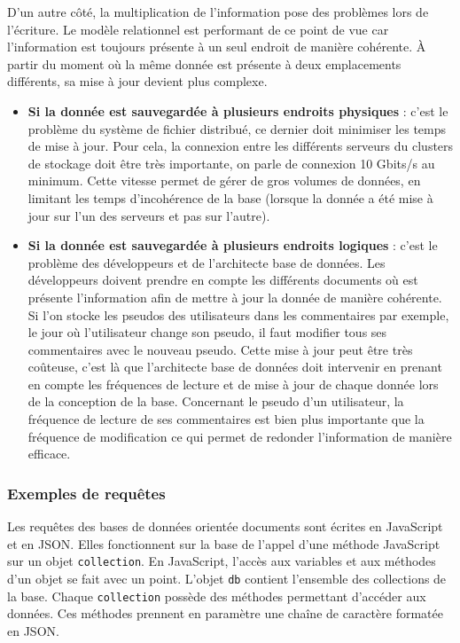   D'un autre côté, la multiplication de l'information pose des problèmes lors de l'écriture. Le modèle relationnel est performant de ce point de vue car l'information est toujours présente à un seul endroit de manière cohérente. À partir du moment où la même donnée est présente à deux emplacements différents, sa mise à jour devient plus complexe.\\

  \begin{itemize}
    \item \textbf{Si la donnée est sauvegardée à plusieurs endroits physiques} : c'est le problème du système de fichier distribué, ce dernier doit minimiser les temps de mise à jour. Pour cela, la connexion entre les différents serveurs du clusters de stockage doit être très importante, on parle de connexion 10 Gbits/s au minimum. Cette vitesse permet de gérer de gros volumes de données, en limitant les temps d'incohérence de la base (lorsque la donnée a été mise à jour sur l'un des serveurs et pas sur l'autre).
    \item \textbf{Si la donnée est sauvegardée à plusieurs endroits logiques} : c'est le problème des développeurs et de l'architecte base de données. Les développeurs doivent prendre en compte les différents documents où est présente l'information afin de mettre à jour la donnée de manière cohérente. Si l'on stocke les pseudos des utilisateurs dans les commentaires par exemple, le jour où l'utilisateur change son pseudo, il faut modifier tous ses commentaires avec le nouveau pseudo. Cette mise à jour peut être très coûteuse, c'est là que l'architecte base de données doit intervenir en prenant en compte les fréquences de lecture et de mise à jour de chaque donnée lors de la conception de la base. Concernant le pseudo d'un utilisateur, la fréquence de lecture de ses commentaires est bien plus importante que la fréquence de modification ce qui permet de redonder l'information de manière efficace.
  \end{itemize}

\subsubsection{Exemples de requêtes}

  Les requêtes des bases de données orientée documents sont écrites en JavaScript et en JSON. Elles fonctionnent sur la base de l'appel d'une méthode JavaScript sur un objet \verb|collection|. En JavaScript, l'accès aux variables et aux méthodes d'un objet se fait avec un point. L'objet \verb|db| contient l'ensemble des collections de la base. Chaque \verb|collection| possède des méthodes permettant d'accéder aux données. Ces méthodes prennent en paramètre une chaîne de caractère formatée en JSON. 

